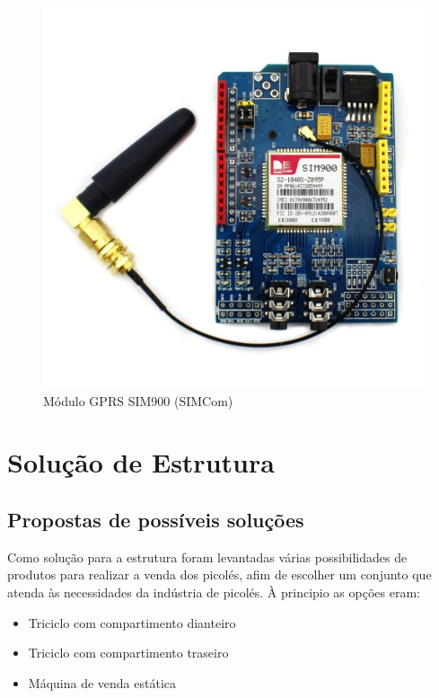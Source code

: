 \begin{figure}[H]
	\centering
    \includegraphics[scale=0.25]{figuras/modulo_gprs}
    \caption{Módulo GPRS SIM900 (SIMCom)}
    \label{fig:modulo_gprs}
\end{figure}

\section{Solução de Estrutura}

\subsection{Propostas de possíveis soluções}
Como solução para a estrutura foram levantadas várias possibilidades de produtos para realizar a venda dos picolés, afim de escolher um conjunto que atenda às necessidades da indústria de picolés. À principio as opções eram:

\begin{itemize}
\item Triciclo com compartimento dianteiro
\item Triciclo com compartimento traseiro
\item Máquina de venda estática
\end{itemize} 

